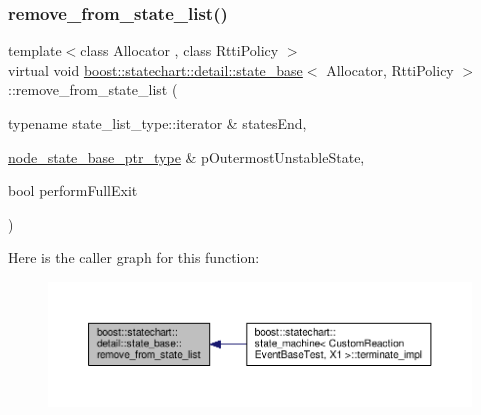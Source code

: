 \subsubsection{\texorpdfstring{remove\+\_\+from\+\_\+state\+\_\+list()}{remove\_from\_state\_list()}}
{\footnotesize\ttfamily template$<$class Allocator , class Rtti\+Policy $>$ \\
virtual void \mbox{\hyperlink{classboost_1_1statechart_1_1detail_1_1state__base}{boost\+::statechart\+::detail\+::state\+\_\+base}}$<$ Allocator, Rtti\+Policy $>$\+::remove\+\_\+from\+\_\+state\+\_\+list (\begin{DoxyParamCaption}\item[{typename state\+\_\+list\+\_\+type\+::iterator \&}]{states\+End,  }\item[{\mbox{\hyperlink{classboost_1_1statechart_1_1detail_1_1state__base_a8e3dd0f80bf95d7df21417a50f1dbaa1}{node\+\_\+state\+\_\+base\+\_\+ptr\+\_\+type}} \&}]{p\+Outermost\+Unstable\+State,  }\item[{bool}]{perform\+Full\+Exit }\end{DoxyParamCaption})\hspace{0.3cm}{\ttfamily [pure virtual]}}

Here is the caller graph for this function\+:
\nopagebreak
\begin{figure}[H]
\begin{center}
\leavevmode
\includegraphics[width=350pt]{classboost_1_1statechart_1_1detail_1_1state__base_a4da77bbc62b6facf16ca3abc9e0d52ce_icgraph}
\end{center}
\end{figure}
\mbox{\label{classboost_1_1statechart_1_1detail_1_1state__base_a43bef6bd20792c22ef224e765d493903}} 
